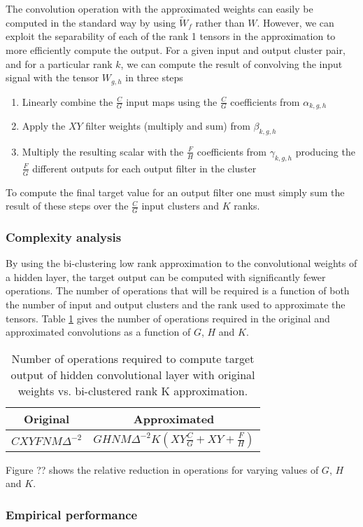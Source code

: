 The convolution operation with the approximated weights can easily be computed in the standard way by using $\tilde{W}_f$ rather than $W$. However, we can exploit the separability of each of the rank 1 tensors in the approximation to more efficiently compute the output. For a given input and output cluster pair, and for a particular rank $k$, we can compute the result of convolving the input signal with the tensor $W_{g,h}$ in three steps
\begin{enumerate}
\item Linearly combine the $\frac{C}{G}$ input maps using the $\frac{C}{G}$ coefficients from $\alpha_{k, g, h}$
\item Apply the $XY$ filter weights (multiply and sum) from $\beta_{k,g,h}$
\item Multiply the resulting scalar with the $\frac{F}{H}$ coefficients from $\gamma_{k,g,h}$ producing the $\frac{F}{G}$ different outputs for each output filter in the cluster 
\end{enumerate}

To compute the final target value for an output filter one must simply sum the result of these steps over the $\frac{C}{G}$ input clusters and $K$ ranks.

\subsubsection{Complexity analysis}
By using the bi-clustering low rank approximation to the convolutional weights of a hidden layer, the target output can be computed with significantly fewer operations. The number of operations that will be required is a function of both the number of input and output clusters and the rank used to approximate the tensors. Table \ref{biclustering_ops} gives the number of operations required in the original and approximated convolutions as a function of $G$, $H$ and $K$. 

\begin{table}[h]
\tiny
\parbox{\linewidth}{
\centering
\begin{tabular}{cc}
\hline
Original & Approximated \\
\hline
$C X Y F N M \Delta^{-2}$  & $G H N M \Delta^{-2} K (X Y \frac{C}{G} + X Y + \frac{F}{H} )$ \\
\hline
\end{tabular}
\caption{Number of operations required to compute target output of hidden convolutional layer with original weights vs. bi-clustered rank K approximation.}
\label{biclustering_ops}
}
\end{table}

Figure ?? shows the relative reduction in operations for varying values of $G$, $H$ and $K$.
\subsubsection{Empirical performance}


